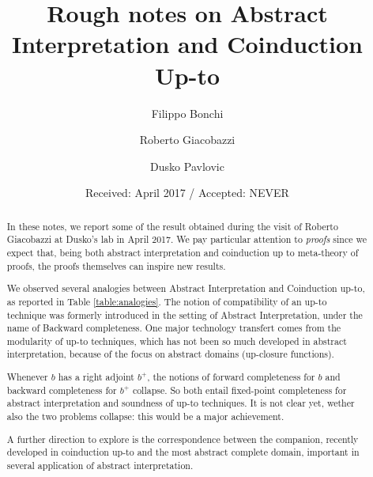 \documentclass[smallcondensed,envcountsect,envcountsame]{svjour3}     %
\begin{document}
\title{Rough notes on Abstract Interpretation and Coinduction Up-to
}


\author{Filippo Bonchi \and Roberto Giacobazzi \and Dusko Pavlovic}



\date{Received: April 2017 / Accepted: NEVER}



\maketitle

\begin{abstract}
In these notes, we report some of the result obtained during the visit of Roberto Giacobazzi at Dusko's lab in April 2017. We pay particular attention to \emph{proofs} since we expect that, being both abstract interpretation and coinduction up to meta-theory of proofs, the proofs themselves can inspire new results. 

We observed several analogies between Abstract Interpretation and Coinduction up-to, as reported in Table \ref{table:analogies}.
The notion of compatibility of an up-to technique was formerly introduced in the setting of Abstract Interpretation, under the name of Backward completeness.
One major technology transfert comes from the modularity of up-to techniques, which has not been so much developed in abstract interpretation, because of the focus on abstract domains (up-closure functions).

Whenever $b$ has a right adjoint $b^+$, the notions of forward completeness for $b$ and backward completeness for $b^+$ collapse. 
%
So both entail fixed-point completeness for abstract interpretation and soundness of up-to techniques.
It is not clear yet, wether also the two problems collapse: this would be a major achievement.

A further direction to explore is the correspondence between the companion, recently developed in coinduction up-to and the most abstract complete domain, important in several application of abstract interpretation.
\end{abstract}
\end{document}
